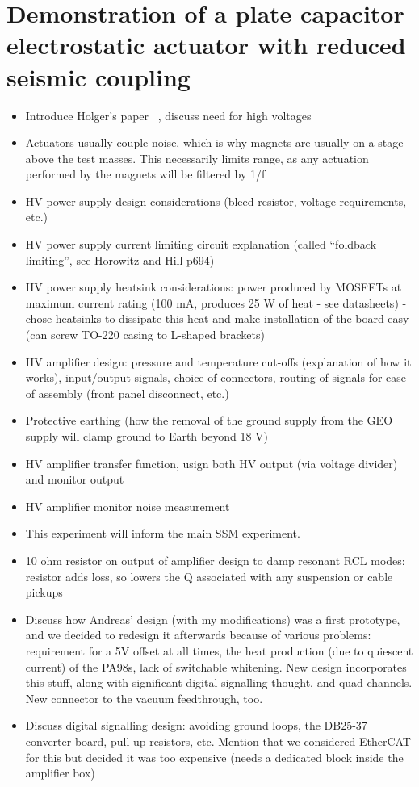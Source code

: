 \chapter{\label{c:esd-concept}Demonstration of a plate capacitor electrostatic actuator with reduced seismic coupling}

\begin{itemize}
  \item Introduce Holger's paper~\cite{Wittel2015} \etal{}, discuss need for high voltages
  \item Actuators usually couple noise, which is why magnets are usually on a stage above the test masses. This necessarily limits range, as any actuation performed by the magnets will be filtered by 1/f
  \item HV power supply design considerations (bleed resistor, voltage requirements, etc.)
  \item HV power supply current limiting circuit explanation (called ``foldback limiting'', see Horowitz and Hill p694)
  \item HV power supply heatsink considerations: power produced by MOSFETs at maximum current rating (100 mA, produces 25 W of heat - see datasheets) - chose heatsinks to dissipate this heat and make installation of the board easy (can screw TO-220 casing to L-shaped brackets)
  \item HV amplifier design: pressure and temperature cut-offs (explanation of how it works), input/output signals, choice of connectors, routing of signals for ease of assembly (front panel disconnect, etc.)
  \item Protective earthing (how the removal of the ground supply from the GEO supply will clamp ground to Earth beyond 18 V)
  \item HV amplifier transfer function, usign both HV output (via voltage divider) and monitor output
  \item HV amplifier monitor noise measurement
  \item This experiment will inform the main SSM experiment.
  \item 10 ohm resistor on output of amplifier design to damp resonant RCL modes: resistor adds loss, so lowers the Q associated with any suspension or cable pickups

  \item Discuss how Andreas' design (with my modifications) was a first prototype, and we decided to redesign it afterwards because of various problems: requirement for a 5V offset at all times, the heat production (due to quiescent current) of the PA98s, lack of switchable whitening. New design incorporates this stuff, along with significant digital signalling thought, and quad channels. New connector to the vacuum feedthrough, too.
  \item Discuss digital signalling design: avoiding ground loops, the DB25-37 converter board, pull-up resistors, etc. Mention that we considered EtherCAT for this but decided it was too expensive (needs a dedicated block inside the amplifier box)
\end{itemize}

